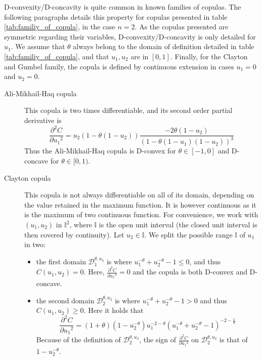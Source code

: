 \begin{remark}
    D-convexity/D-concavity is quite common in known families of copulas. The following paragraphs details this property for copulas presented in table \ref{tab:familiy_of_copula}, in the case $n=2$.
    As the copulas presented are symmetric regarding their variables, D-convexity/D-concavity is only detailed for $u_1$. We assume that \( \theta \) always belong to the domain of definition detailed in table \ref{tab:familiy_of_copula}, and that \(u_1, u_2\) are in \([0, 1]\). Finally, for the Clayton and Gumbel family, the copula is defined by continuous extension in cases $u_1=0$ and $u_2=0$. 
    \begin{description}
        \item[Ali-Mikhail-Haq copula] This copula is two times differentiable, and its second order partial derivative is
        $$\frac{\partial^2 C}{\partial {u_1}^2}=u_2(1-\theta(1-u_2))\frac{-2\theta(1-u_2)}{(1-\theta(1-u_1)(1-u_2))^3}$$
        Thus the Ali-Mikhail-Haq copula is D-convex for $\theta\in[-1,0]$ and D-concave for $\theta\in[0,1)$.
        \item[Clayton copula] This copula is not always differentiable on all of its domain, depending on the value retained in the maximum function. It is however continuous as it is the maximum of two continuous function. For convenience, we work with $(u_1, u_2)$ in $\mathbb{I}^2$, where $\mathbb{I}$ is the open unit interval (the closed unit interval is then covered by continuity). Let $u_2\in\mathbb{I}$. We split the possible range $\mathbb{I}$ of $u_1$ in two:
    \begin{itemize}
        \item the first domain $\mathcal{D}_1^{\theta,u_2}$ is where $u_1^{-\theta}+u_2^{-\theta}-1\leqslant0$, and thus $C(u_1, u_2)=0$. Here, $\frac{\partial^2 C}{\partial {u_1}^2}=0$ and the copula is both D-convex and D-concave.
        \item the second domain $\mathcal{D}_2^{\theta,u_2}$ is where $u_1^{-\theta}+u_2^{-\theta}-1>0$ and thus $C(u_1, u_2)\geqslant0$. Here it holds that
        $$\frac{\partial^2 C}{\partial {u_1}^2}=(1+\theta)(1-u_2^{-\theta})u_1^{-2-\theta}(u_1^{-\theta}+u_2^{-\theta}-1)^{-2-\frac{1}{\theta}}$$
        Because of the definition of $\mathcal{D}_2^{\theta,u_2}$, the sign of $\frac{\partial^2 C}{\partial {u_1}^2}$ on $\mathcal{D}_2^{\theta,u_2}$ is that of $1-u_2^{-\theta}$.
    \end{itemize}
    

\end{description}
\end{remark}
